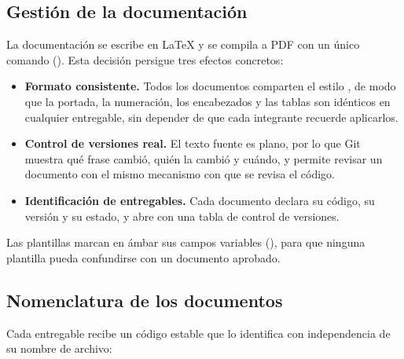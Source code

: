 \subsection{Gestión de la documentación}

La documentación se escribe en \LaTeX{} y se compila a PDF con un único comando
(). Esta decisión persigue tres efectos concretos:

\begin{itemize}
  \item \textbf{Formato consistente.} Todos los documentos comparten el estilo
        , de modo que la portada, la numeración, los
        encabezados y las tablas son idénticos en cualquier entregable, sin
        depender de que cada integrante recuerde aplicarlos.
  \item \textbf{Control de versiones real.} El texto fuente es plano, por lo que
        Git muestra qué frase cambió, quién la cambió y cuándo, y permite revisar
        un documento con el mismo mecanismo con que se revisa el código.
  \item \textbf{Identificación de entregables.} Cada documento declara su código,
        su versión y su estado, y abre con una tabla de control de versiones.
\end{itemize}

Las plantillas marcan en ámbar sus campos variables (), para que
ninguna plantilla pueda confundirse con un documento aprobado.

\subsection{Nomenclatura de los documentos}

Cada entregable recibe un código estable que lo identifica con independencia de su
nombre de archivo:

